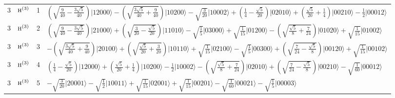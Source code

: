 \documentclass[11pt]{article}
\newcommand{\irr}[1]{\text{\normalfont\scshape #1}}
\newcommand{\occ}[1]{\lvert #1\rangle}
\begin{document}
\begin{longtable}{c l c p{}}
3 & $\irr{h}^{(3)}$ & 1 & $(\sqrt{\frac{9}{40} - \frac{3 \sqrt{5}}{40}})\occ{12000}-(\sqrt{\frac{3 \sqrt{5}}{40} + \frac{9}{40}})\occ{10200}-\sqrt{\tfrac{3}{20}}\occ{10002}+(\frac{1}{4} - \frac{\sqrt{5}}{20})\occ{02010}+(\frac{\sqrt{5}}{20} + \frac{1}{4})\occ{00210}-\tfrac{1}{2}\occ{00012}$\\
3 & $\irr{h}^{(3)}$ & 2 & $(\sqrt{\frac{9}{40} - \frac{3 \sqrt{5}}{40}})\occ{21000}+(\sqrt{\frac{3}{20} - \frac{\sqrt{5}}{20}})\occ{11010}-\sqrt{\tfrac{1}{5}}\occ{03000}+\sqrt{\tfrac{1}{15}}\occ{01200}-(\sqrt{\frac{\sqrt{5}}{8} + \frac{7}{24}})\occ{01020}+\sqrt{\tfrac{1}{15}}\occ{01002}$\\
3 & $\irr{h}^{(3)}$ & 3 & $-(\sqrt{\frac{3 \sqrt{5}}{40} + \frac{9}{40}})\occ{20100}+(\sqrt{\frac{\sqrt{5}}{20} + \frac{3}{20}})\occ{10110}+\sqrt{\tfrac{1}{15}}\occ{02100}-\sqrt{\tfrac{1}{5}}\occ{00300}+(\sqrt{\frac{7}{24} - \frac{\sqrt{5}}{8}})\occ{00120}+\sqrt{\tfrac{1}{15}}\occ{00102}$\\
3 & $\irr{h}^{(3)}$ & 4 & $(\frac{1}{4} - \frac{\sqrt{5}}{20})\occ{12000}+(\frac{\sqrt{5}}{20} + \frac{1}{4})\occ{10200}-\tfrac{1}{2}\occ{10002}-(\sqrt{\frac{\sqrt{5}}{8} + \frac{7}{24}})\occ{02010}+(\sqrt{\frac{7}{24} - \frac{\sqrt{5}}{8}})\occ{00210}-\sqrt{\tfrac{1}{60}}\occ{00012}$\\
3 & $\irr{h}^{(3)}$ & 5 & $-\sqrt{\tfrac{3}{20}}\occ{20001}-\sqrt{\tfrac{1}{2}}\occ{10011}+\sqrt{\tfrac{1}{15}}\occ{02001}+\sqrt{\tfrac{1}{15}}\occ{00201}-\sqrt{\tfrac{1}{60}}\occ{00021}-\sqrt{\tfrac{1}{5}}\occ{00003}$\\
\hline
\end{longtable}
\end{document}
